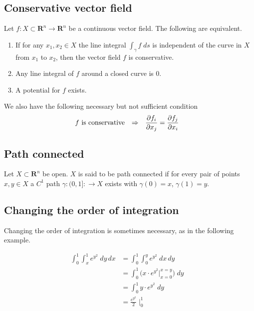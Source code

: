 \documentclass[8pt]{extarticle}
\newcommand{\R}{{\mathbb R}}
\newcommand{\X}{{\mathcal X}}
\newcommand{\ra}{{\rightarrow}}
\newcommand{\Ra}{{\Rightarrow}}
\def\R{\mathbf{R}}
\def\X{X}
\def\BoxStart{\begin{tcolorbox}[colback=blue!5!white,colframe=blue!75!black]}
\def\BoxEnd{\end{tcolorbox}}
\begin{document}
\begin{multicols*}{3}
  \subsection{Conservative vector field}
  Let $f: \X \subset \R^n \ra \R^n$ be a continuous vector
  field. The following are equivalent.
  \begin{enumerate}[label=(\arabic*)]
    \item If for any $x_1, x_2 \in \X$ the line integral
          $\int_\gamma f \; ds$ is independent of the curve in $\X$
          from $x_1$ to $x_2$, then the vector field $f$ is conservative.
    \item Any line integral of $f$ around a closed curve is $0$.
    \item A potential for $f$ exists.
  \end{enumerate}
  We also have the following necessary but not sufficient
  condition
  \begin{align*}
    f \text{ is conservative} \quad \Ra \quad \pdv{f_i}{x_j} = \pdv{f_j}{x_i}
  \end{align*}
  \subsection{Path connected}
  Let $\X \subset \R^n$ be open. $\X$ is said to be path
  connected if for every pair of points $x, y \in \X$ a $C^1$
  path $\gamma: (0, 1]: \ra \X$ exists with $\gamma(0) = x$, $\gamma(1) = y$.
  \subsection{Changing the order of integration}
  Changing the order of integration is sometimes necessary,
  as in the following example.
\BoxStart

  \begin{align*}
    \int_0^1 \int_x^1 e^{y^2} \; dy \, dx
     & = \int_0^1 \int_0^y e^{y^2} \; dx \, dy                             \\
     & = \int_0^1 \Big( x \cdot e^{y^2} \Big |_{x = 0}^{x = y} \Big) \; dy \\
     & = \int_0^1 y \cdot e^{y^2} \; dy                                    \\
     & = \frac{e^{y^2}}{2} \; \Big |_0^1
  \end{align*}
\BoxEnd

\end{multicols*}
\end{document}
